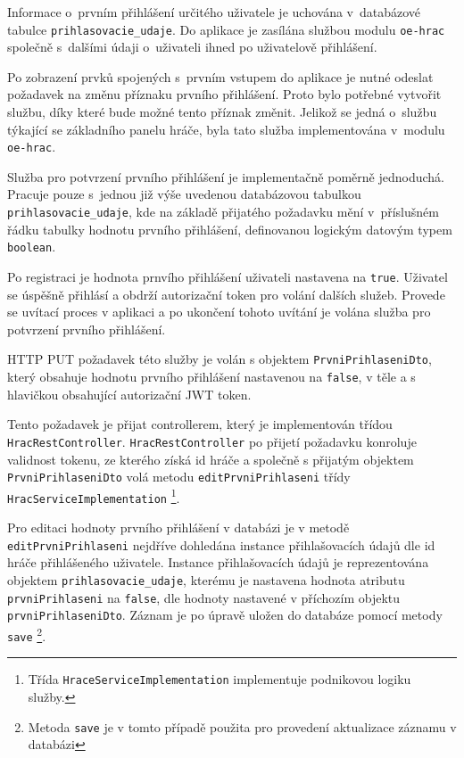 \documentclass[twoside, 12pt]{article}
\begin{document}
{Informace o~prvním přihlášení určitého uživatele je uchována v~databázové tabulce \texttt{prihlasovacie\_udaje}.
Do aplikace je zasílána službou modulu \texttt{oe-hrac} společně s~dalšími údaji o~uživateli ihned po uživatelově přihlášení.

Po zobrazení prvků spojených s~prvním vstupem do aplikace je nutné odeslat požadavek na změnu příznaku prvního přihlášení.
Proto bylo potřebné vytvořit službu, díky které bude možné tento příznak změnit.
Jelikož se jedná o~službu týkající se základního panelu hráče, byla tato služba implementována v~modulu \texttt{oe-hrac}.

Služba pro potvrzení prvního přihlášení je implementačně poměrně jednoduchá.
Pracuje pouze s~jednou již výše uvedenou databázovou tabulkou \texttt{prihlasovacie\_udaje},
kde na základě přijatého požadavku mění v~příslušném řádku tabulky hodnotu prvního přihlášení,
definovanou logickým datovým typem \texttt{boolean}.

Po registraci je hodnota prnvího přihlášení uživateli nastavena na \texttt{true}.
Uživatel se úspěšně přihlásí a obdrží autorizační token pro volání dalších služeb.
Provede se uvítací proces v aplikaci a po ukončení tohoto uvítání
je volána služba pro potvrzení prvního přihlášení.

HTTP PUT požadavek této služby je volán s objektem \texttt{PrvniPrihlaseniDto},
který obsahuje hodnotu prvního přihlášení nastavenou na \texttt{false}, v těle
a s hlavičkou obsahující autorizační JWT token.

Tento požadavek je přijat controllerem, který je implementován třídou \texttt{HracRestController}.
\texttt{HracRestController} po přijetí požadavku konroluje validnost tokenu, ze kterého získá id hráče
a společně s přijatým objektem \texttt{PrvniPrihlaseniDto} volá metodu \texttt{editPrvniPrihlaseni}
třídy \texttt{HracServiceImplementation}
\footnote{Třída \texttt{HraceServiceImplementation} implementuje podnikovou logiku služby.}.

Pro editaci hodnoty prvního přihlášení v databázi je v metodě \texttt{editPrvniPrihlaseni} nejdříve dohledána
instance přihlašovacích údajů dle id hráče přihlášeného uživatele.
Instance přihlašovacích údajů je reprezentována objektem \texttt{prihlasovacie\_udaje},
kterému je nastavena hodnota atributu \texttt{prvniPrihlaseni} na \texttt{false},
dle hodnoty nastavené v příchozím objektu \texttt{prvniPrihlaseniDto}.
Záznam je po úpravě uložen do databáze pomocí metody \texttt{save}
\footnote{Metoda \texttt{save} je v tomto případě použita pro provedení aktualizace záznamu v databázi}.

}
\end{document}

